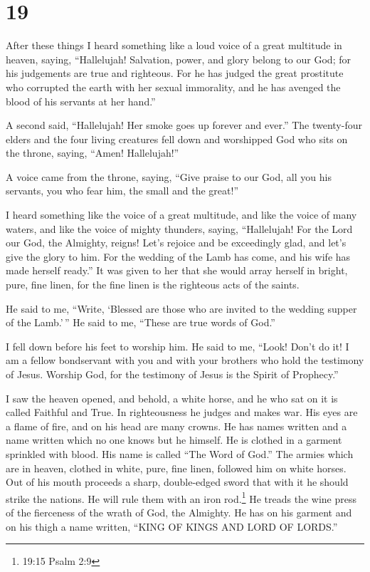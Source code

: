 \hypertarget{section-18}{%
\section{19}\label{section-18}}

 After these things I heard something like a loud voice of a
great multitude in heaven, saying, ``Hallelujah! Salvation, power, and
glory belong to our God;  for his judgements are true and
righteous. For he has judged the great prostitute who corrupted the
earth with her sexual immorality, and he has avenged the blood of his
servants at her hand.''

 A second said, ``Hallelujah! Her smoke goes up forever and
ever.''  The twenty-four elders and the four living
creatures fell down and worshipped God who sits on the throne, saying,
``Amen! Hallelujah!''

 A voice came from the throne, saying, ``Give praise to our
God, all you his servants, you who fear him, the small and the great!''

 I heard something like the voice of a great multitude, and
like the voice of many waters, and like the voice of mighty thunders,
saying, ``Hallelujah! For the Lord our God, the Almighty, reigns!
 Let's rejoice and be exceedingly glad, and let's give the
glory to him. For the wedding of the Lamb has come, and his wife has
made herself ready.''  It was given to her that she would
array herself in bright, pure, fine linen, for the fine linen is the
righteous acts of the saints.

 He said to me, ``Write, `Blessed are those who are invited
to the wedding supper of the Lamb.'\,'' He said to me, ``These are true
words of God.''

 I fell down before his feet to worship him. He said to me,
``Look! Don't do it! I am a fellow bondservant with you and with your
brothers who hold the testimony of Jesus. Worship God, for the testimony
of Jesus is the Spirit of Prophecy.''

 I saw the heaven opened, and behold, a white horse, and he
who sat on it is called Faithful and True. In righteousness he judges
and makes war.  His eyes are a flame of fire, and on his
head are many crowns. He has names written and a name written which no
one knows but he himself.  He is clothed in a garment
sprinkled with blood. His name is called ``The Word of God.''
 The armies which are in heaven, clothed in white, pure,
fine linen, followed him on white horses.  Out of his mouth
proceeds a sharp, double-edged sword that with it he should strike the
nations. He will rule them with an iron rod.\footnote{19:15 Psalm 2:9}
He treads the wine press of the fierceness of the wrath of God, the
Almighty.  He has on his garment and on his thigh a name
written, ``KING OF KINGS AND LORD OF LORDS.''

